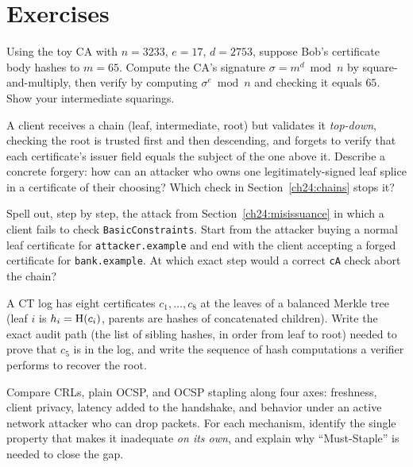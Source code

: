 \section*{Exercises}

\begin{exercise}
Using the toy CA with $n = 3233$, $e = 17$, $d = 2753$, suppose Bob's certificate body hashes to $m = 65$. Compute the CA's signature $\sigma = m^d \bmod n$ by square-and-multiply, then verify by computing $\sigma^e \bmod n$ and checking it equals $65$. Show your intermediate squarings.
\end{exercise}

\begin{exercise}
A client receives a chain (leaf, intermediate, root) but validates it \emph{top-down}, checking the root is trusted first and then descending, and forgets to verify that each certificate's issuer field equals the subject of the one above it. Describe a concrete forgery: how can an attacker who owns one legitimately-signed leaf splice in a certificate of their choosing? Which check in Section~\ref{ch24:chains} stops it?
\end{exercise}

\begin{exercise}
Spell out, step by step, the attack from Section~\ref{ch24:misissuance} in which a client fails to check \texttt{BasicConstraints}. Start from the attacker buying a normal leaf certificate for \texttt{attacker.example} and end with the client accepting a forged certificate for \texttt{bank.example}. At which exact step would a correct \texttt{cA} check abort the chain?
\end{exercise}

\begin{exercise}
A CT log has eight certificates $c_1,\dots,c_8$ at the leaves of a balanced Merkle tree (leaf $i$ is $h_i = \operatorname{H}(c_i)$, parents are hashes of concatenated children). Write the exact audit path (the list of sibling hashes, in order from leaf to root) needed to prove that $c_5$ is in the log, and write the sequence of hash computations a verifier performs to recover the root.
\end{exercise}

\begin{exercise}
Compare CRLs, plain OCSP, and OCSP stapling along four axes: freshness, client privacy, latency added to the handshake, and behavior under an active network attacker who can drop packets. For each mechanism, identify the single property that makes it inadequate \emph{on its own}, and explain why ``Must-Staple'' is needed to close the gap.
\end{exercise}

